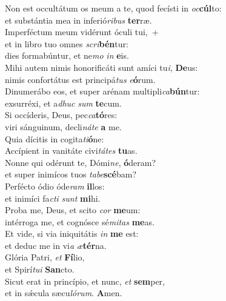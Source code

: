 \evenverse Non est occultátum os meum a te, quod fecísti in \textit{oc}\textbf{cúl}to:~\*\\
\evenverse et substántia mea in inferió\textit{ri}\textit{bus} \textbf{ter}ræ.\\
\oddverse Imperféctum meum vidérunt óculi tui,~+\\
\oddverse  et in libro tuo omnes \textit{scri}\textbf{bén}tur:~\*\\
\oddverse dies formabúntur, et ne\textit{mo} \textit{in} \textbf{e}is.\\
\evenverse Mihi autem nimis honorificáti sunt amíci tu\textit{i}, \textbf{De}us:~\*\\
\evenverse nimis confortátus est principá\textit{tus} \textit{e}\textbf{ó}rum.\\
\oddverse Dinumerábo eos, et super arénam multipli\textit{ca}\textbf{bún}tur:~\*\\
\oddverse exsurréxi, et a\textit{dhuc} \textit{sum} \textbf{te}cum.\\
\evenverse Si occíderis, Deus, pec\textit{ca}\textbf{tó}res:~\*\\
\evenverse viri sánguinum, decli\textit{ná}\textit{te} \textbf{a} me.\\
\oddverse Quia dícitis in cogita\textit{ti}\textbf{ó}ne:~\*\\
\oddverse Accípient in vanitáte civi\textit{tá}\textit{tes} \textbf{tu}as.\\
\evenverse Nonne qui odérunt te, Dómi\textit{ne}, \textbf{ó}deram?~\*\\
\evenverse et super inimícos tuos \textit{ta}\textit{be}\textbf{scé}bam?\\
\oddverse Perfécto ódio óde\textit{ram} \textbf{il}los:~\*\\
\oddverse et inimíci fa\textit{cti} \textit{sunt} \textbf{mi}hi.\\
\evenverse Proba me, Deus, et scito \textit{cor} \textbf{me}um:~\*\\
\evenverse intérroga me, et cognósce sé\textit{mi}\textit{tas} \textbf{me}as.\\
\oddverse Et vide, si via iniquitátis \textit{in} \textbf{me} est:~\*\\
\oddverse et deduc me in vi\textit{a} \textit{æ}\textbf{tér}na.\\
\evenverse Glória Patri, \textit{et} \textbf{Fí}lio,~\*\\
\evenverse et Spirí\textit{tu}\textit{i} \textbf{San}cto.\\
\oddverse Sicut erat in princípio, et nunc, \textit{et} \textbf{sem}per,~\*\\
\oddverse et in sǽcula sæcu\textit{ló}\textit{rum}. \textbf{A}men.\\
